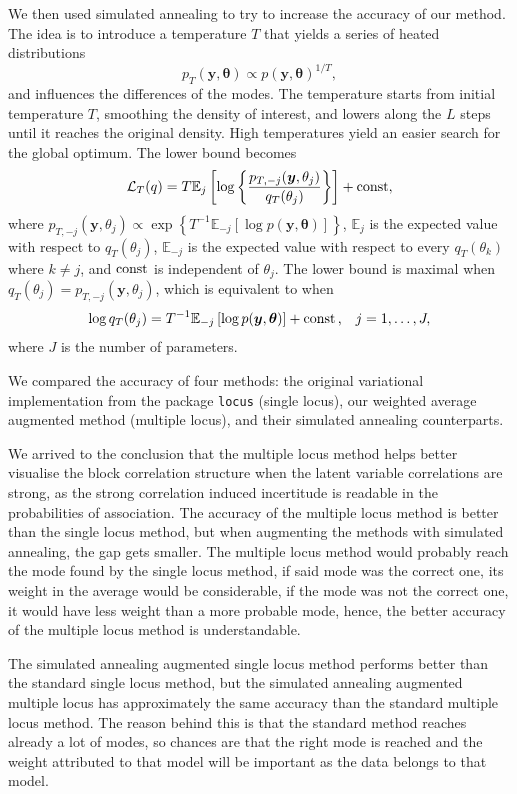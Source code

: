 \documentclass[a4paper, 11pt]{report}
\numberwithin{equation}{chapter}
\DeclareMathOperator*{\const}{{\rm const}}
\begin{document}
We then used simulated annealing to try to increase the accuracy of our method. The idea is to introduce a temperature $T$ that yields a series of heated distributions
$$
p_T(\boldsymbol{y},\boldsymbol{\theta}) \propto p(\boldsymbol{y},\boldsymbol{\theta})^{1/T},
$$
and influences the differences of the modes. The temperature starts from initial temperature $T$, smoothing the density of interest, and lowers along the $L$ steps until it reaches the original density. High temperatures yield an easier search for the global optimum. The lower bound becomes
$$
\mathcal{L}_T(q) = T\mathbb{E}_j\left[\log\left\lbrace\frac{p_{T, -j}(\boldsymbol{y}, \theta_j)}{q_T(\theta_j)}\right\rbrace\right] + \const,	
$$
where $p_{T, -j}(\boldsymbol{y},\theta_j) \propto \exp\left\lbrace T^{-1}\mathbb{E}_{-j}\left[\log p(\boldsymbol{y},\boldsymbol{\theta})\right]\right\rbrace$, $\mathbb{E}_j$ is the expected value with respect to $q_T(\theta_j)$, $\mathbb{E}_{-j}$ is the expected value with respect to every $ q_T(\theta_k)$ where $k \neq j$, and $\const$ is independent of $\theta_j$. The lower bound is maximal when $q_T(\theta_j) = p_{T,-j}(\boldsymbol{y},\theta_j)$, which is equivalent to when
$$
\log q_T(\theta_j) = T^{-1} \mathbb{E}_{-j}\left[\log p(\boldsymbol{y}, \boldsymbol{\theta})\right] + \const\text{,}\quad j=1,\dots,J,
$$
where $J$ is the number of parameters.

We compared the accuracy of four methods: the original variational implementation from the package \texttt{locus} (single locus), our weighted average augmented method (multiple locus), and their simulated annealing counterparts. 

We arrived to the conclusion that the multiple locus method helps better visualise the block correlation structure when the latent variable correlations are strong, as the strong correlation induced incertitude is readable in the probabilities of association. The accuracy of the multiple locus method is better than the single locus method, but when augmenting the methods with simulated annealing, the gap gets smaller. The multiple locus method would probably reach the mode found by the single locus method, if said mode was the correct one, its weight in the average would be considerable, if the mode was not the correct one, it would have less weight than a more probable mode, hence, the better accuracy of the multiple locus method is understandable.

The simulated annealing augmented single locus method performs better than the standard single locus method, but the simulated annealing augmented multiple locus has approximately the same accuracy than the standard multiple locus method. The reason behind this is that the standard method reaches already a lot of modes, so chances are that the right mode is reached and the weight attributed to that model will be important as the data belongs to that model.
\end{document}
